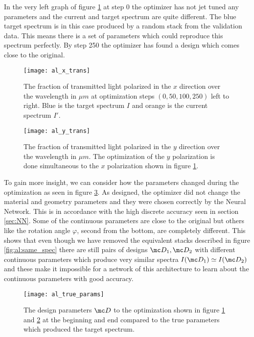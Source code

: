 \indent
In the very left graph of figure \ref{fig:al:x_trans} at step 0 the 
optimizer has not jet tuned any parameters and the current and target spectrum are quite different. The blue target spectrum is in this case produced by a random stack from the validation data. This means there is a set of parameters which could reproduce this spectrum perfectly. By step 250 the optimizer has found a design which comes close to the original.

\begin{figure}[H]
    \centering
    \texttt{[image: al\_x\_trans]}
    \caption{The fraction of transmitted light polarized in the $x$ direction over the wavelength in $\mu m$ at optimization steps 
    $(0, 50, 100, 250)$ left to right. Blue is the target spectrum $I$ and orange is the current spectrum $I'$.}
    \label{fig:al:x_trans}
\end{figure}

\begin{figure}[H]
    \centering
    \texttt{[image: al\_y\_trans]}
    \caption{The fraction of transmitted light polarized in the $y$ direction over the wavelength in $\mu m$. The optimization of the $y$ polarization is done simultaneous to the $x$ polarization shown in figure \ref{fig:al:x_trans}.}
    \label{fig:al:y_trans}
\end{figure}

To gain more insight, we can consider how the parameters changed during the optimization as seen in figure \ref{fig:al:true_params}. As designed, the optimizer did not change the material and geometry parameters and they were chosen correctly by the Neural Network. This is in accordance with the high discrete accuracy seen in section \ref{sec:NN}. Some of the continuous parameters are close to the original but others like the rotation angle $\varphi$, second from the bottom, are completely different. This shows that even though we have removed the equivalent stacks described in figure \ref{fig:al:same_spec} there are still pairs of designs $\mc D_1, \mc D_2$ with different continuous parameters which produce very similar spectra $I \qty(\mc D_1) \simeq I \qty(\mc D_2)$ and these make it impossible for a network of this architecture to learn about the continuous parameters with good accuracy.

\begin{figure}[H]
    \centering
    \texttt{[image: al\_true\_params]}
    \caption{The design parameters $\mc D$ to the optimization shown in figure \ref{fig:al:x_trans} and \ref{fig:al:y_trans} at the beginning and end compared to the true parameters which produced the target spectrum.}
    \label{fig:al:true_params}
\end{figure} 